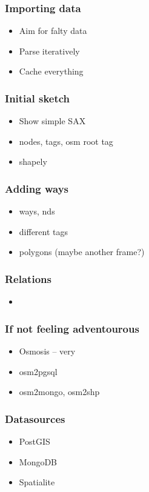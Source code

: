 \documentclass{beamer}
\begin{document}
\begin{frame}
  \frametitle{Importing data}
  \begin{itemize}
  \item Aim for falty data
  \item Parse iteratively
  \item Cache everything
  \end{itemize}
\end{frame}

\begin{frame}
  \frametitle{Initial sketch}
  \begin{itemize}
  \item Show simple SAX
  \item nodes, tags, osm root tag
  \item shapely
  \end{itemize}
\end{frame}

\begin{frame}
  \frametitle{Adding ways}
  \begin{itemize}
  \item ways, nds
  \item different tags
  \item polygons (maybe another frame?)
  \end{itemize}
\end{frame}


\begin{frame}
  \frametitle{Relations}
  \begin{itemize}
  \item
  \end{itemize}
\end{frame}

\begin{frame}
  \frametitle{If not feeling adventourous}
  \begin{itemize}
  \item Osmosis -- very
  \item osm2pgsql
  \item osm2mongo, osm2shp
  \end{itemize}
\end{frame}

\begin{frame}
  \frametitle{Datasources}
  \begin{itemize}
  \item PostGIS
  \item MongoDB
  \item Spatialite
  \end{itemize}
\end{frame}
\end{document}
